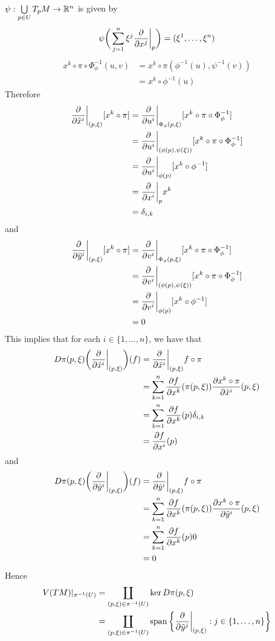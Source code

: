 \documentclass{book}
\begin{document}
\begin{ex}
	$\psi: \bigcup\limits_{p \in U} T_pM \rightarrow \mathbb{R}^n$ is given by 
	$$\psi \bigg (\sum_{j=1}^n \xi^j \frac{\partial}{\partial x^j} \bigg|_p \bigg) = (\xi^1, \ldots, \xi^n)$$
	\begin{align*}
		x^k \circ \pi \circ \Phi_{\phi}^{-1}(u,v)
		& =  x^k \circ \pi (\phi^{-1}(u), \psi^{-1}(v)) \\
		& = x^k \circ \phi^{-1}(u) 
	\end{align*}	
	Therefore
	\begin{align*}
		\frac{\partial }{\partial \tilde{x}^i} \bigg|_{(p,\xi)} [x^k \circ \pi  ]
		& = \frac{\partial }{\partial u^i} \bigg|_{\Phi_{\phi}(p,\xi)}[ x^k \circ \pi \circ \Phi_{\phi}^{-1} ]\\
		& = \frac{\partial }{\partial u^i} \bigg|_{(\phi(p), \psi(\xi))} [x^k \circ \pi \circ \Phi_{\phi}^{-1}] \\
		& = \frac{\partial }{\partial u^i} \bigg|_{\phi(p)}  [x^k \circ \phi^{-1}] \\
		& =  \frac{\partial }{\partial x^i} \bigg|_{p} x^k \\
		& = \delta_{i,k}
	\end{align*}
	and 
	\begin{align*}
		\frac{\partial }{\partial \tilde{y}^i} \bigg|_{(p,\xi)} [x^k \circ \pi  ]
		& = \frac{\partial }{\partial v^i} \bigg|_{\Phi_{\phi}(p,\xi)}[ x^k \circ \pi \circ \Phi_{\phi}^{-1} ]\\
		& = \frac{\partial }{\partial v^i} \bigg|_{(\phi(p), \psi(\xi))} [x^k \circ \pi \circ \Phi_{\phi}^{-1}] \\
		& = \frac{\partial }{\partial v^i} \bigg|_{\phi(p)}  [x^k \circ \phi^{-1}] \\
		& = 0
	\end{align*}
	This implies that for each $i \in \{1, \ldots, n\}$, we have that 
	\begin{align*}
		D \pi (p, \xi) \bigg( \frac{\partial}{\partial \tilde{x}^i } \bigg|_{(p, \xi)} \bigg) (f)
		& = \frac{\partial}{\partial \tilde{x}^i} \bigg|_{(p, \xi)} f \circ \pi \\
		& = \sum_{k=1}^n \frac{\partial f }{\partial x^k}(\pi (p,\xi)) \frac{\partial x^k \circ \pi }{\partial \tilde{x}^i}(p,\xi) \\
		& = \sum_{k=1}^n \frac{\partial f }{\partial x^k}(p) \delta_{i,k} \\
		& = \frac{\partial f }{\partial x^i}(p) 
	\end{align*}
	and 
	\begin{align*}
		D \pi (p, \xi) \bigg( \frac{\partial}{\partial \tilde{y}^i } \bigg|_{(p, \xi)} \bigg) (f)
		& = \frac{\partial}{\partial \tilde{y}^i} \bigg|_{(p, \xi)} f \circ \pi \\
		& = \sum_{k=1}^n \frac{\partial f }{\partial x^k}(\pi (p,\xi)) \frac{\partial x^k \circ \pi }{\partial \tilde{y}^i}(p,\xi) \\
		& = \sum_{k=1}^n \frac{\partial f }{\partial x^k}(p) 0 \\
		& = 0
	\end{align*}
	Hence 
	\begin{align*}
		V(TM)|_{\pi^{-1}(U)}
		& = \coprod_{(p, \xi) \in \pi^{-1}(U)} \ker D \pi(p, \xi) \\
		& = \coprod_{(p, \xi) \in \pi^{-1}(U)} \operatorname{span} \bigg \{ \frac{\partial}{\partial \tilde{y}^j} \bigg|_{(p, \xi)}: j \in \{1, \ldots, n\} \bigg \} 
	\end{align*}
\end{ex}
\end{document}
